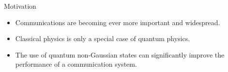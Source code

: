 \begin{frame}{Motivation}
    \begin{itemize}
        \item Communications are becoming ever more important and widespread.
        \item Classical physics is only a special case of quantum physics.
        \item The use of quantum non-Gaussian states can significantly improve the performance 
                of a communication system.
    \end{itemize}
\end{frame}